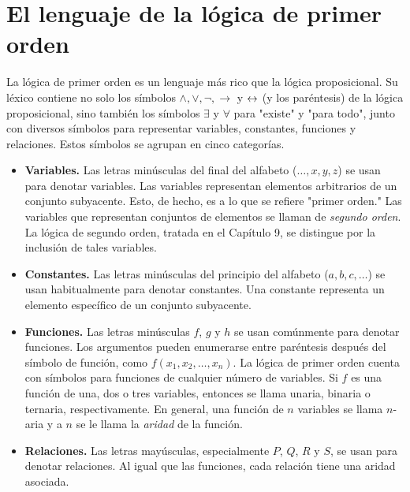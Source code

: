 \message{ !name(main.tex)}\documentclass[12pt,a4paper]{book}
\newcommand{\comillas}[1]{"#1"}
\begin{document}
    \section{El lenguaje de la lógica de primer orden}

    La lógica de primer orden es un lenguaje más rico que la lógica proposicional. Su léxico contiene no solo los símbolos
    $\wedge,\vee,\neg,\rightarrow$ y $\leftrightarrow$ (y los paréntesis) de la lógica proposicional, sino también los símbolos $\exists$ y
    $\forall$ para \comillas{existe} y \comillas{para todo}, junto con diversos símbolos para representar variables,
    constantes, funciones y relaciones. Estos símbolos se agrupan en cinco categorías.

    \begin{itemize}
        \item[$\bullet$] \textbf{Variables.} Las letras minúsculas del final del alfabeto ($\dots,x,y,z$) se usan para
        denotar variables. Las variables representan elementos arbitrarios de un conjunto subyacente. Esto, de hecho, es a lo
        que se refiere \comillas{primer orden.} Las variables que representan conjuntos de elementos se llaman de
        \textit{segundo orden}. La lógica de segundo orden, tratada en el Capítulo 9, se distingue por la inclusión de tales
        variables.
        \item[$\bullet$] \textbf{Constantes.} Las letras minúsculas del principio del alfabeto ($a,b,c,\dots$) se usan
        habitualmente para denotar constantes. Una constante representa un elemento específico de un conjunto subyacente.
        \item[$\bullet$] \textbf{Funciones.} Las letras minúsculas $f$, $g$ y $h$ se usan comúnmente para denotar funciones.
        Los argumentos pueden enumerarse entre paréntesis después del símbolo de función, como $f(x_{1},x_{2},\dots,x_{n})$.
        La lógica de primer orden cuenta con símbolos para funciones de cualquier número de variables. Si $f$ es una función
        de una, dos o tres variables, entonces se llama unaria, binaria o ternaria, respectivamente. En general, una función
        de $n$ variables se llama $n$-aria y a $n$ se le llama la \textit{aridad} de la función.
        \item[$\bullet$] \textbf{Relaciones.} Las letras mayúsculas, especialmente $P$, $Q$, $R$ y $S$, se usan para denotar
        relaciones. Al igual que las funciones, cada relación tiene una aridad asociada.
    \end{itemize}
\end{document}
